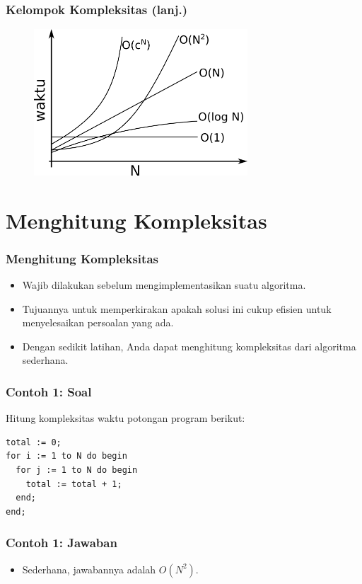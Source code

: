 \documentclass{beamer}
\begin{document}
\begin{frame}
\frametitle{Kelompok Kompleksitas (lanj.)}
\begin{figure}
	\includegraphics[width=8cm]{asset/grafik.png}
\end{figure}
\end{frame}

\section{Menghitung Kompleksitas}
\frame{\sectionpage}

\begin{frame}
\frametitle{Menghitung Kompleksitas}
\begin{itemize}
	\item Wajib dilakukan sebelum mengimplementasikan suatu algoritma.
	\item Tujuannya untuk memperkirakan apakah solusi ini cukup efisien untuk menyelesaikan persoalan yang ada.
	\item Dengan sedikit latihan, Anda dapat menghitung kompleksitas dari algoritma sederhana.
\end{itemize}
\end{frame}

\begin{frame}[fragile]
\frametitle{Contoh 1: Soal}
Hitung kompleksitas waktu potongan program berikut:

\hfill

\begin{lstlisting}
total := 0;
for i := 1 to N do begin
  for j := 1 to N do begin
    total := total + 1;
  end;
end;
\end{lstlisting}
\end{frame}

\begin{frame}
\frametitle{Contoh 1: Jawaban}
\begin{itemize}
	\item Sederhana, jawabannya adalah $O(N^2)$.
\end{itemize}
\end{frame}
\end{document}

